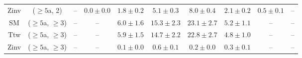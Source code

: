 \begin{table}[h!]
{\begin{tabular}{cccccccccc}
	Zinv & ($\ge5$a, 2) & -- & $0.0\pm 0.0$ & $1.8\pm 0.2$ & $5.1\pm 0.3$ & $8.0\pm 0.4$ & $2.1\pm 0.2$ & $0.5\pm 0.1$ & -- \\[0.5ex] 
	SM & ($\ge5$a, $\ge3$) & -- & -- & $6.0\pm 1.6$ & $15.3\pm 2.3$ & $23.1\pm 2.7$ & $5.2\pm 1.1$ & -- & -- \\[0.5ex] 
	Ttw & ($\ge5$a, $\ge3$) & -- & -- & $5.9\pm 1.5$ & $14.7\pm 2.2$ & $22.8\pm 2.7$ & $4.8\pm 1.0$ & -- & -- \\[0.5ex] 
	Zinv & ($\ge5$a, $\ge3$) & -- & -- & $0.1\pm 0.0$ & $0.6\pm 0.1$ & $0.2\pm 0.0$ & $0.3\pm 0.1$ & -- & -- \\[0.5ex] 
	\hline
	\hline
\end{tabular}}
\end{table}
